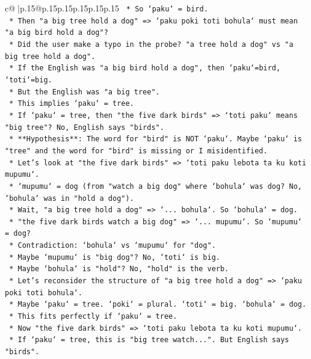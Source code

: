 \documentclass{article}
\begin{document}
{\begin{supertabular}{c@{$\;$}|p{.15\linewidth}@{}p{.15\linewidth}p{.15\linewidth}p{.15\linewidth}p{.15\linewidth}p{.15\linewidth}}
{{{\texttt{        *   So `paku` = bird.} \\
\texttt{        *   Then "a big tree hold a dog" => `paku poki toti bohula` must mean "a big bird hold a dog"?} \\
\texttt{        *   Did the user make a typo in the probe? "a tree hold a dog" vs "a big tree hold a dog".} \\
\texttt{        *   If the English was "a big bird hold a dog", then `paku`=bird, `toti`=big.} \\
\texttt{        *   But the English was "a big tree".} \\
\texttt{        *   This implies `paku` = tree.} \\
\texttt{        *   If `paku` = tree, then "the five dark birds" => `toti paku` means "big tree"? No, English says "birds".} \\
\texttt{        *   **Hypothesis**: The word for "bird" is NOT `paku`. Maybe `paku` is "tree" and the word for "bird" is missing or I misidentified.} \\
\texttt{        *   Let's look at "the five dark birds" => `toti paku lebota ta ku koti mupumu`.} \\
\texttt{            *   `mupumu` = dog (from "watch a big dog" where `bohula` was dog? No, `bohula` was in "hold a dog").} \\
\texttt{            *   Wait, "a big tree hold a dog" => `... bohula`. So `bohula` = dog.} \\
\texttt{            *   "the five dark birds watch a big dog" => `... mupumu`. So `mupumu` = dog?} \\
\texttt{            *   Contradiction: `bohula` vs `mupumu` for "dog".} \\
\texttt{            *   Maybe `mupumu` is "big dog"? No, `toti` is big.} \\
\texttt{            *   Maybe `bohula` is "hold"? No, "hold" is the verb.} \\
\texttt{            *   Let's reconsider the structure of "a big tree hold a dog" => `paku poki toti bohula`.} \\
\texttt{                *   Maybe `paku` = tree. `poki` = plural. `toti` = big. `bohula` = dog.} \\
\texttt{                *   This fits perfectly if `paku` = tree.} \\
\texttt{            *   Now "the five dark birds" => `toti paku lebota ta ku koti mupumu`.} \\
\texttt{                *   If `paku` = tree, this is "big tree watch...". But English says "birds".} \\
}}}
\end{supertabular}}
\end{document}
